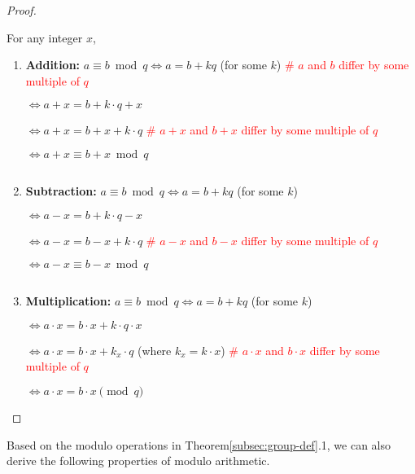 \begin{proof}

$ $

For any integer $x$,

\begin{enumerate}


\item \textbf{Addition:} $a \equiv b \bmod q \Longleftrightarrow a = b + k q $ (for some $k$) \textcolor{red}{ \text{ } \# $a$ and $b$ differ by some multiple of $q$}

$\Longleftrightarrow a + x = b + k\cdot q + x$

$\Longleftrightarrow a + x = b + x + k\cdot q$ \textcolor{red}{ \text{ }  \# $a+x$ and $b+x$ differ by some multiple of $q$}

$\Longleftrightarrow a + x \equiv b + x \bmod q$

$ $

\item \textbf{Subtraction:} $a \equiv b \bmod q \Longleftrightarrow a = b + k q $ (for some $k$)

$\Longleftrightarrow a - x = b + k\cdot q - x$

$\Longleftrightarrow a - x = b - x + k\cdot q$  \textcolor{red}{ \text{ }  \# $a-x$ and $b-x$ differ by some multiple of $q$}

$\Longleftrightarrow a - x \equiv b - x \bmod q$

$ $

\item \textbf{Multiplication:} $a \equiv b \bmod q \Longleftrightarrow a = b + k q $ (for some $k$)

$\Longleftrightarrow a \cdot x = b \cdot x + k\cdot q \cdot x$

$\Longleftrightarrow a \cdot x = b \cdot x + k_x\cdot q$ (where $k_x = k \cdot x$)  \textcolor{red}{ \text{ }  \# $a\cdot x$ and $b\cdot x$ differ by some multiple of $q$}

$\Longleftrightarrow a \cdot x = b \cdot x \pmod q$

\end{enumerate}
\end{proof}

Based on the modulo operations in Theorem\ref*{subsec:group-def}.1, we can also derive the following properties of modulo arithmetic. 

